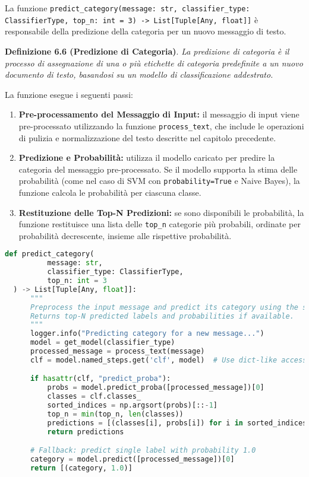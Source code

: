 La funzione \texttt{predict\_category(message: str, classifier\_type: ClassifierType, top\_n: int = 3) -> List[Tuple[Any, float]]} è responsabile della predizione della categoria per un nuovo messaggio di testo. \newline

 \textbf{Definizione 6.6 (Predizione di Categoria)}. \textit{La predizione di categoria è il processo di assegnazione di una o più etichette di categoria predefinite a un nuovo documento di testo, basandosi su un modello di classificazione addestrato.}\newline

 La funzione esegue i seguenti passi:
 \begin{enumerate}
     \item \textbf{Pre-processamento del Messaggio di Input:} il messaggio di input viene pre-processato utilizzando la funzione \texttt{process\_text}, che include le operazioni di pulizia e normalizzazione del testo descritte nel capitolo precedente.
     \item \textbf{Predizione e Probabilità:} utilizza il modello caricato per predire la categoria del messaggio pre-processato. Se il modello supporta la stima delle probabilità (come nel caso di SVM con \texttt{probability=True} e Naive Bayes), la funzione calcola le probabilità per ciascuna classe.
     \item \textbf{Restituzione delle Top-N Predizioni:} se sono disponibili le probabilità, la funzione restituisce una lista delle \texttt{top\_n} categorie più probabili, ordinate per probabilità decrescente, insieme alle rispettive probabilità.
 \end{enumerate}
\newpage
 \begin{lstlisting}[language=Python,caption={Funzione predict\_category}]
  def predict_category(
          message: str,
          classifier_type: ClassifierType,
          top_n: int = 3
  ) -> List[Tuple[Any, float]]:
      """
      Preprocess the input message and predict its category using the specified classifier.
      Returns top-N predicted labels and probabilities if available.
      """
      logger.info("Predicting category for a new message...")
      model = get_model(classifier_type)
      processed_message = process_text(message)
      clf = model.named_steps.get('clf', model)  # Use dict-like access if available

      if hasattr(clf, "predict_proba"):
          probs = model.predict_proba([processed_message])[0]
          classes = clf.classes_
          sorted_indices = np.argsort(probs)[::-1]
          top_n = min(top_n, len(classes))
          predictions = [(classes[i], probs[i]) for i in sorted_indices[:top_n]]
          return predictions

      # Fallback: predict single label with probability 1.0
      category = model.predict([processed_message])[0]
      return [(category, 1.0)]
 \end{lstlisting}